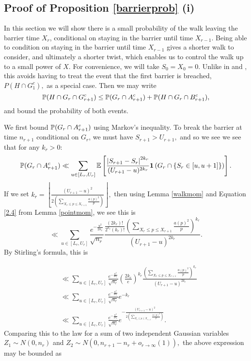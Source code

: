 \documentclass[12pt]{amsart}
\def\P{\ensuremath\mathbb{P}}
\def\E{\ensuremath\mathbb{E}}
\numberwithin{equation}{section}
\numberwithin{thm}{section}
\newcommand{\1}{\mathbf 1}
\begin{document}
 \subsection{Proof of Proposition \ref{barrierprob} (i)}
 In this section we will show there is a small probability of the walk leaving the barrier time $X_r$, conditional on staying in the barrier until time $X_{r-1}$. Being able to condition on staying in the barrier until time $X_{r-1}$ gives a shorter walk to consider, and ultimately a shorter twist, which enables us to control the walk up to a small power of $X.$ For convenience, we will take $S_{0}=X_0=0.$ Unlike in \cite{AB24} and \cite{AC25}, this avoids having to treat the event that the first barrier is breached, $P(H\cap G_1^c),$ as a special case.
Then we may write \begin{equation}\label{decompmid}\P(H\cap G_r\cap G_{r+1}^c)\le \P(G_{r}\cap A_{r+1}^c)+\P(H\cap G_r\cap B_{r+1}^c),\end{equation} and bound the probability of both events.

We first bound $\P(G_{r}\cap A_{r+1}^c)$ using Markov's inequality. To break the barrier at time $n_{r+1}$ conditional on $G_{r}$, we must have $S_{{r+1}}>U_{r+1},$ and so we see  we see that for any $k_r>0$: \begin{equation}\label{AMarkov}
	\P(G_{r}\cap A_{r+1}^c)\ll \sum_{u\in [L_r,U_r]} \E\left[\frac{\left|S_{{r+1}}-S_{r}\right|^{2k_r}}{(U_{r+1}-u)^{2k_r}}\mathbf{1}\left(G_r\cap \{S_{r}\in [u,u+1]\}\right) \right].
\end{equation}  
If we set $k_r=\left\lfloor\frac{ (U_{r+1}-u)^2 }{2\left(\sum_{X_{r}\le p\le X_{r+1}}\frac{a(p)^2}{p}\right)}\right\rfloor,$ then using Lemma \ref{walkmom} and Equation \ref{2.4} from Lemma \ref{pointmom}, we see this is \begin{equation}
\ll 	\sum_{u\in [L_r,U_r]}\frac{e^{-\frac{u^2}{2n_r}}}{\sqrt{n_r}} \frac{\frac{(2k_r)!}{2^{k_r}(k_r)!}\left(\sum_{X_{r}\le p\le X_{r+1}}\frac{a(p)^2}{p}\right)^{k_r}}{(U_{r+1}-u)^{2k_r}}.  \end{equation}
By Stirling's formula, this is

\begin{align}
	&\ll \sum_{u\in [L_r,U_r]}\frac{e^{-\frac{u^2}{2n_r}}}{\sqrt{n_r}} \left(\frac{2k_r}{e}\right)^{k_r}\frac{\left(\sum_{X_{r}\le p\le X_{r+1}}\frac{a(p)^2}{p}\right)^{k_r}}{(U_{r+1}-u)^{2k_r}} \\
	&\ll \sum_{u\in [L_r,U_r]}\frac{e^{-\frac{u^2}{2n_r}}}{\sqrt{n_r}}e^{-k_r}\\
	&\ll \sum_{u\in [L_r,U_r]}\frac{e^{-\frac{u^2}{2n_r}}}{\sqrt{n_r}}e^{-\frac{ (U_{r+1}-u)^2 }{2\left(\sum_{X_{r}\le p\le X_{r+1}}\frac{a(p)^2}{p}\right)}}.
\end{align}
Comparing this to the law for a sum of two independent Gaussian variables $Z_1\sim N(0,n_r)$ and $Z_2\sim N(0,n_{r+1}-n_r+o_{r\to\infty}(1)),$ the above expression may be bounded as
\end{document}
